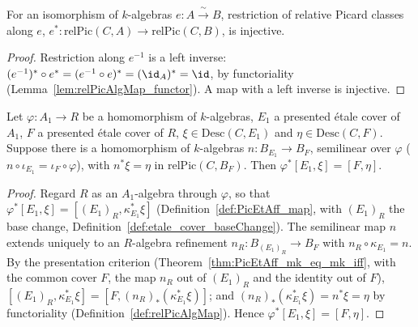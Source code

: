 \begin{lemma}
  \label{lem:relPicAlgMap_algEquiv_injective}
  \leanok
  For an isomorphism of \(k\)-algebras \(e \colon A \xrightarrow{\ \sim\ } B\), restriction of
  relative Picard classes along \(e\), \(e^{*} \colon \mathrm{relPic}(C, A) \to \mathrm{relPic}(C,
  B)\), is injective.
\end{lemma}
\begin{proof}
  \leanok
  Restriction along \(e^{-1}\) is a left inverse: \((e^{-1})^{*} \circ e^{*} = (e^{-1} \circ e)^{*}
  = (\id_A)^{*} = \id\), by functoriality (Lemma~\ref{lem:relPicAlgMap_functor}). A map with a left
  inverse is injective.
\end{proof}

\begin{lemma}
  \label{lem:PicEtAff_mapAlg_mk_eq_mk}
  \leanok
  Let \(\varphi \colon A_1 \to R\) be a homomorphism of \(k\)-algebras, \(E_1\) a presented \'etale
  cover of \(A_1\), \(F\) a presented \'etale cover of \(R\), \(\xi \in \mathrm{Desc}(C, E_1)\) and
  \(\eta \in \mathrm{Desc}(C, F)\). Suppose there is a homomorphism of \(k\)-algebras \(n \colon
  B_{E_1} \to B_F\), semilinear over \(\varphi\) (\(n \circ \iota_{E_1} = \iota_F \circ \varphi\)),
  with \(n^{*}\xi = \eta\) in \(\mathrm{relPic}(C, B_F)\). Then \(\varphi^{*}[E_1, \xi] = [F, \eta]\).
\end{lemma}
\begin{proof}
  \leanok
  Regard \(R\) as an \(A_1\)-algebra through \(\varphi\), so that \(\varphi^{*}[E_1, \xi] =
  [(E_1)_R, \kappa_{E_1}^{*}\xi]\) (Definition~\ref{def:PicEtAff_map}, with \((E_1)_R\) the base
  change, Definition~\ref{def:etale_cover_baseChange}). The semilinear map \(n\) extends uniquely to
  an \(R\)-algebra refinement \(n_R \colon B_{(E_1)_R} \to B_F\) with \(n_R \circ \kappa_{E_1} = n\).
  By the presentation criterion (Theorem~\ref{thm:PicEtAff_mk_eq_mk_iff}, with the common cover
  \(F\), the map \(n_R\) out of \((E_1)_R\) and the identity out of \(F\)), \([(E_1)_R,
  \kappa_{E_1}^{*}\xi] = [F, (n_R)_{*}(\kappa_{E_1}^{*}\xi)]\); and \((n_R)_{*}(\kappa_{E_1}^{*}\xi)
  = n^{*}\xi = \eta\) by functoriality (Definition~\ref{def:relPicAlgMap}). Hence
  \(\varphi^{*}[E_1, \xi] = [F, \eta]\).
\end{proof}

